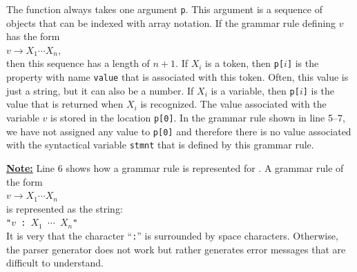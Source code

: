 \begin{enumerate}
      The function always takes one argument \texttt{p}.  This argument is a sequence of objects that can be
      indexed with array notation. If the grammar rule defining $v$ has the form
      \\[0.2cm]
      \hspace*{1.3cm}
      $v \rightarrow X_1 \cdots X_n$,
      \\[0.2cm]
      then this sequence has a length of $n+1$.  If $X_i$ is a token, then \texttt{p[$i$]} is the property
      with name \texttt{value} that is associated with this token.  Often, this value is just a string, but it
      can also be a number.  If $X_i$ is a variable, then  \texttt{p[$i$]} is the value that is returned
      when $X_i$ is recognized.  The value associated with the variable $v$ is stored in the location
      \texttt{p[0]}.  In the grammar rule shown in line 5--7, we have not assigned any value to \texttt{p[0]} and
      therefore there is no value associated with the syntactical variable \texttt{stmnt} that is defined by
      this grammar rule.

      \underline{\textbf{Note:}} Line 6 shows how a grammar rule is represented for .
      A grammar rule of the form 
      \\[0.2cm]
      \hspace*{1.3cm}
      $v \rightarrow X_1 \cdots X_n$
      \\[0.2cm]
      is represented as the string:
      \\[0.2cm]
      \hspace*{1.3cm}
      \texttt{"$v$ : $X_1$ $\cdots$ $X_n$"}
      \\[0.2cm]
      It is very  that the character ``\texttt{:}'' is
      surrounded by space characters.  Otherwise, the parser generator does not work but rather generates error
      messages that are difficult to understand. 


\end{enumerate}
